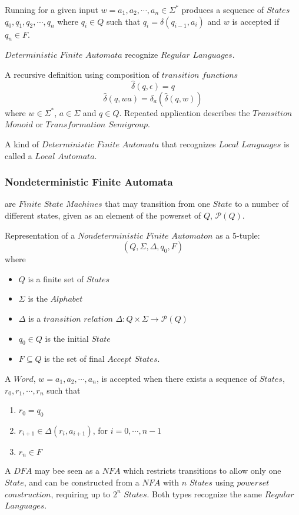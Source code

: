 \documentclass{article}
\begin{document}
Running for a given input $w = a_1,a_2, \cdots , a_n \in \Sigma^*$
produces a sequence of $States$ $q_0,q_1,q_2,\cdots , q_n$ where $q_i
\in Q$ such that $q_i = \delta (q_{i-1},a_i)$ and $w$ is accepted if
$q_n \in F$.

$Deterministic$ $Finite$ $Automata$ recognize $Regular$ $Languages$.

A recursive definition using composition of $transition$ $functions$
\[
    \widehat{\delta}(q,\epsilon) = q
\]\[
    \widehat{\delta}(q,wa) = \delta_a(\widehat{\delta}(q,w))
\]
where $w \in \Sigma^*$, $a \in \Sigma$ and $q \in Q$. Repeated
application describes the $Transition$ $Monoid$ or $Transformation$
$Semigroup$.

A kind of $Deterministic$ $Finite$ $Automata$ that recognizes $Local$
$Languages$ is called a $Local$ $Automata$.

\subsubsection{Nondeterministic Finite Automata} are $Finite$ $State$
$Machines$ that may transition from one $State$ to a number of
different states, given as an element of the powerset of $Q$,
$\mathcal{P}(Q)$.

Representation of a $Nondeterministic$ $Finite$ $Automaton$ as a
5-tuple:
\[
    (Q,\Sigma,\Delta,q_0,F)
\]
where
\begin{itemize}
\item $Q$ is a finite set of $States$
\item $\Sigma$ is the $Alphabet$
\item $\Delta$ is a $transition$ $relation$ $\Delta: Q \times
  \Sigma \rightarrow \mathcal{P}(Q)$
\item $q_0 \in Q$ is the initial $State$
\item $F \subseteq Q$ is the set of final $Accept$ $States$.
\end{itemize}

A $Word$, $w=a_1,a_2,\cdots,a_n$, is accepted when there exists a
sequence of $States$, $r_0,r_1,\cdots,r_n$ such that
\begin{enumerate}
\item $r_0 = q_0$
\item $r_{i+1} \in \Delta(r_i, a_{i+1})$, for $i = 0, \cdots, n-1$
\item $r_n \in F$
\end{enumerate}

A $DFA$ may bee seen as a $NFA$ which restricts transitions to allow
only one $State$, and can be constructed from a $NFA$ with $n$
$States$ using $powerset$ $construction$, requiring up to $2^n$
$States$. Both types recognize the same $Regular$ $Languages$.
\end{document}
